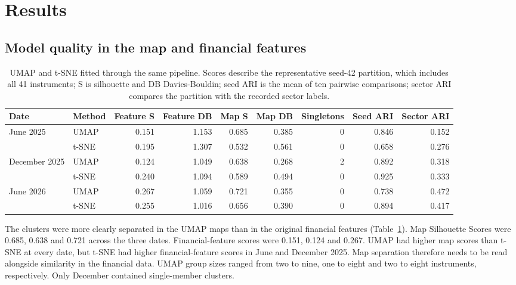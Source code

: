 \section{Results}

\subsection{Model quality in the map and financial features}

\begin{table}[htbp]
\centering\caption{UMAP and t-SNE fitted through the same pipeline. Scores describe the representative seed-42 partition, which includes all 41 instruments; S is silhouette and DB Davies-Bouldin; seed ARI is the mean of ten pairwise comparisons; sector ARI compares the partition with the recorded sector labels.}\label{tab:method_quality}
\footnotesize
\begin{tabularx}{\linewidth}{@{}>{\raggedright\arraybackslash}X l r r r r r r r@{}}
\toprule
Date & Method & Feature S & Feature DB & Map S & Map DB & Singletons & Seed ARI & Sector ARI \\
\midrule
June 2025 & UMAP & 0.151 & 1.153 & 0.685 & 0.385 & 0 & 0.846 & 0.152 \\
 & t-SNE & 0.195 & 1.307 & 0.532 & 0.561 & 0 & 0.658 & 0.276 \\
December 2025 & UMAP & 0.124 & 1.049 & 0.638 & 0.268 & 2 & 0.892 & 0.318 \\
 & t-SNE & 0.240 & 1.094 & 0.589 & 0.494 & 0 & 0.925 & 0.333 \\
June 2026 & UMAP & 0.267 & 1.059 & 0.721 & 0.355 & 0 & 0.738 & 0.472 \\
 & t-SNE & 0.255 & 1.016 & 0.656 & 0.390 & 0 & 0.894 & 0.417 \\
\bottomrule
\end{tabularx}
\end{table}

The clusters were more clearly separated in the UMAP maps than in the original financial features (Table~\ref{tab:method_quality}). Map Silhouette Scores were 0.685, 0.638 and 0.721 across the three dates. Financial-feature scores were 0.151, 0.124 and 0.267. UMAP had higher map scores than t-SNE at every date, but t-SNE had higher financial-feature scores in June and December 2025. Map separation therefore needs to be read alongside similarity in the financial data. UMAP group sizes ranged from two to nine, one to eight and two to eight instruments, respectively. Only December contained single-member clusters.

